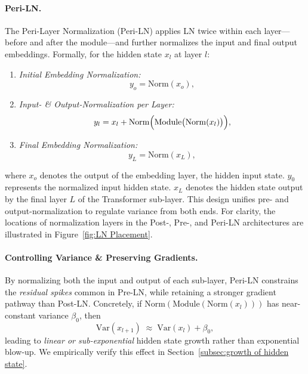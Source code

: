 \paragraph{Peri-LN.}
The Peri-Layer Normalization (Peri-LN) applies LN twice within each layer---before and after the module---and further normalizes the input and final output embeddings. Formally, for the hidden state $x_l$ at layer $l$:
\begin{enumerate}
    \item \textit{Initial Embedding Normalization:}
    \[
      y_o = \mathrm{Norm}(x_o),
    \]
    \item \textit{Input- \& Output-Normalization per Layer:}
    \[
      y_l = x_l + \mathrm{Norm}\Bigl(\mathrm{Module}\bigl(\mathrm{Norm}(x_l)\bigr)\Bigr),
    \]
    \item \textit{Final Embedding Normalization:}
    \[
      y_L = \mathrm{Norm}(x_L),
    \]
\end{enumerate}
where $x_o$ denotes the output of the embedding layer, the hidden input state. $y_0$ represents the normalized input hidden state. $x_L$ denotes the hidden state output by the final layer \(L\) of the Transformer sub-layer. This design unifies pre- and output-normalization to regulate variance from both ends. For clarity, the locations of normalization layers in the Post-, Pre-, and Peri-LN architectures are illustrated in Figure~\ref{fig:LN Placement}.


\paragraph{Controlling Variance \& Preserving Gradients.}
By normalizing both the input and output of each sub-layer, Peri-LN constrains the \emph{residual spikes} common in Pre-LN, while retaining a stronger gradient pathway than Post-LN. Concretely, if $\mathrm{Norm}(\mathrm{Module}(\mathrm{Norm}(x_l)))$ has near-constant variance $\beta_0$, then
\[
  \mathrm{Var}(x_{l+1}) \;\approx\; \mathrm{Var}(x_l) + \beta_0,
\]
leading to \emph{linear or sub-exponential} hidden state growth rather than exponential blow-up.  We empirically verify this effect in Section~\ref{subsec:growth of hidden state}. 



